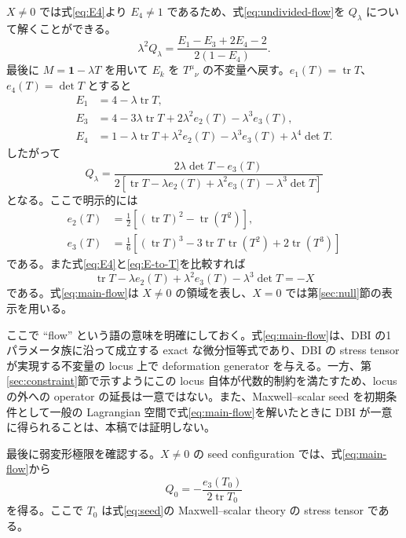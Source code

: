 \documentclass[a4paper,11pt]{ltjsarticle}
\numberwithin{equation}{section}
\newcommand{\tr}{\operatorname{tr}}
\newcommand{\Id}{\mathbf 1}
\begin{document}
$X\neq0$ では式\eqref{eq:E4}より $E_4\neq1$ であるため、式\eqref{eq:undivided-flow}を $Q_\lambda$ について解くことができる。
\begin{equation}
 \lambda^2Q_\lambda
 =\frac{E_1-E_3+2E_4-2}{2(1-E_4)}.
 \label{eq:flow-E}
\end{equation}
最後に $M=\Id-\lambda T$ を用いて $E_k$ を $T^\mu{}_{\nu}$ の不変量へ戻す。$e_1(T)=\tr T$、$e_4(T)=\det T$ とすると
\begin{align}
 E_1&=4-\lambda\tr T,\nonumber\\
 E_3&=4-3\lambda\tr T+2\lambda^2e_2(T)-\lambda^3e_3(T),\nonumber\\
 E_4&=1-\lambda\tr T+\lambda^2e_2(T)-\lambda^3e_3(T)+\lambda^4\det T.
 \label{eq:E-to-T}
\end{align}
したがって
\begin{equation}
 Q_\lambda
 =\frac{2\lambda\det T-e_3(T)}
 {2\left[\tr T-\lambda e_2(T)+\lambda^2e_3(T)-\lambda^3\det T\right]}
 \label{eq:main-flow}
\end{equation}
となる。ここで明示的には
\begin{align}
 e_2(T)&=\frac12\left[(\tr T)^2-\tr(T^2)\right],\nonumber\\
 e_3(T)&=\frac16\left[(\tr T)^3-3\tr T\,\tr(T^2)+2\tr(T^3)\right]
 \label{eq:e2e3-explicit}
\end{align}
である。また式\eqref{eq:E4}と\eqref{eq:E-to-T}を比較すれば
\begin{equation}
 \tr T-\lambda e_2(T)+\lambda^2e_3(T)-\lambda^3\det T=-X
 \label{eq:denominator-X}
\end{equation}
である。式\eqref{eq:main-flow}は $X\neq0$ の領域を表し、$X=0$ では第\ref{sec:null}節の表示を用いる。

ここで ``flow'' という語の意味を明確にしておく。式\eqref{eq:main-flow}は、DBI の1パラメータ族に沿って成立する exact な微分恒等式であり、DBI の stress tensor が実現する不変量の locus 上で deformation generator を与える。一方、第\ref{sec:constraint}節で示すようにこの locus 自体が代数的制約を満たすため、locus の外への operator の延長は一意ではない。また、Maxwell--scalar seed を初期条件として一般の Lagrangian 空間で式\eqref{eq:main-flow}を解いたときに DBI が一意に得られることは、本稿では証明しない。

最後に弱変形極限を確認する。$X\neq0$ の seed configuration では、式\eqref{eq:main-flow}から
\begin{equation}
 Q_0=-\frac{e_3(T_0)}{2\tr T_0}
 \label{eq:leading-flow}
\end{equation}
を得る。ここで $T_0$ は式\eqref{eq:seed}の Maxwell--scalar theory の stress tensor である。
\end{document}
